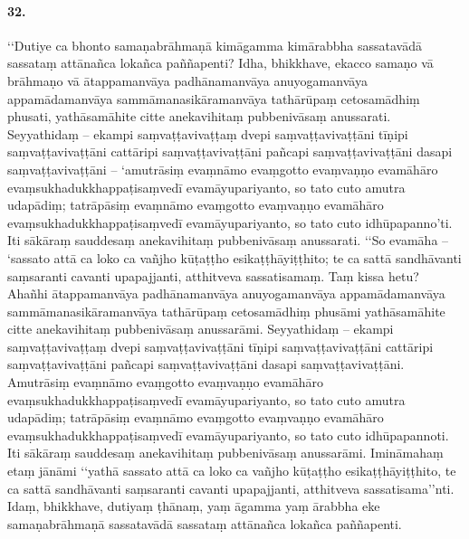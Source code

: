 \paragraph{32.}
‘‘Dutiye ca bhonto samaṇabrāhmaṇā kimāgamma kimārabbha sassatavādā sassataṃ attānañca lokañca paññapenti? Idha, bhikkhave, ekacco samaṇo vā brāhmaṇo vā ātappamanvāya padhānamanvāya anuyogamanvāya appamādamanvāya sammāmanasikāramanvāya tathārūpaṃ cetosamādhiṃ phusati, yathāsamāhite citte anekavihitaṃ pubbenivāsaṃ anussarati. Seyyathidaṃ – ekampi saṃvaṭṭavivaṭṭaṃ dvepi saṃvaṭṭavivaṭṭāni tīṇipi saṃvaṭṭavivaṭṭāni cattāripi saṃvaṭṭavivaṭṭāni pañcapi saṃvaṭṭavivaṭṭāni dasapi saṃvaṭṭavivaṭṭāni – ‘amutrāsiṃ evaṃnāmo evaṃgotto evaṃvaṇṇo evamāhāro evaṃsukhadukkhappaṭisaṃvedī evamāyupariyanto, so tato cuto amutra udapādiṃ; tatrāpāsiṃ evaṃnāmo evaṃgotto evaṃvaṇṇo evamāhāro evaṃsukhadukkhappaṭisaṃvedī evamāyupariyanto, so tato cuto idhūpapanno’ti. Iti sākāraṃ sauddesaṃ anekavihitaṃ pubbenivāsaṃ anussarati. ‘‘So evamāha – ‘sassato attā ca loko ca vañjho kūṭaṭṭho esikaṭṭhāyiṭṭhito; te ca sattā sandhāvanti saṃsaranti cavanti upapajjanti, atthitveva sassatisamaṃ. Taṃ kissa hetu? Ahañhi ātappamanvāya padhānamanvāya anuyogamanvāya appamādamanvāya sammāmanasikāramanvāya tathārūpaṃ cetosamādhiṃ phusāmi yathāsamāhite citte anekavihitaṃ pubbenivāsaṃ anussarāmi. Seyyathidaṃ – ekampi saṃvaṭṭavivaṭṭaṃ dvepi saṃvaṭṭavivaṭṭāni tīṇipi saṃvaṭṭavivaṭṭāni cattāripi saṃvaṭṭavivaṭṭāni pañcapi saṃvaṭṭavivaṭṭāni dasapi saṃvaṭṭavivaṭṭāni. Amutrāsiṃ evaṃnāmo evaṃgotto evaṃvaṇṇo evamāhāro evaṃsukhadukkhappaṭisaṃvedī evamāyupariyanto, so tato cuto amutra udapādiṃ; tatrāpāsiṃ evaṃnāmo evaṃgotto evaṃvaṇṇo evamāhāro evaṃsukhadukkhappaṭisaṃvedī evamāyupariyanto, so tato cuto idhūpapannoti. Iti sākāraṃ sauddesaṃ anekavihitaṃ pubbenivāsaṃ anussarāmi. Imināmahaṃ etaṃ jānāmi ‘‘yathā sassato attā ca loko ca vañjho kūṭaṭṭho esikaṭṭhāyiṭṭhito, te ca sattā sandhāvanti saṃsaranti cavanti upapajjanti, atthitveva sassatisama’’nti. Idaṃ, bhikkhave, dutiyaṃ ṭhānaṃ, yaṃ āgamma yaṃ ārabbha eke samaṇabrāhmaṇā sassatavādā sassataṃ attānañca lokañca paññapenti.

